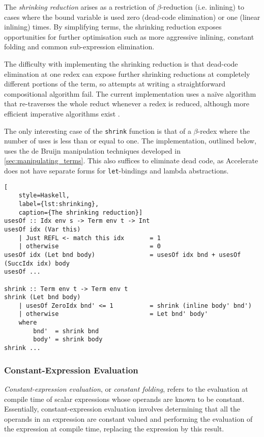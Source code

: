The \emph{shrinking reduction} arises as a restriction of $\beta$-reduction
(i.e. inlining) to cases where the bound variable is used zero (dead-code
elimination) or one (linear inlining) times. By simplifying terms,
the shrinking reduction exposes opportunities for further optimisation such as
more aggressive inlining, constant folding and common sub-expression
elimination. %

The difficulty with implementing the shrinking reduction is that dead-code
elimination at one redex can expose further shrinking reductions at completely
different portions of the term, so attempts at writing a straightforward
compositional algorithm fail. The current implementation uses a na\"ive
algorithm that re-traverses the whole reduct whenever a redex is reduced,
although more efficient imperative algorithms exist
\cite{Appel:1997gs,Benton:2004ua,Kennedy:2007cb}.

The only interesting case of the \texttt{shrink} function is that of a
$\beta$-redex where the number of uses is less than or equal to one. The
implementation, outlined below, uses the de Bruijn manipulation techniques
developed in \autoref{sec:manipulating_terms}. This also suffices to eliminate
dead code, as Accelerate does not have separate forms for \texttt{let}-bindings
and lambda abstractions.
%
\begin{lstlisting}[
    style=Haskell,
    label={lst:shrinking},
    caption={The shrinking reduction}]
usesOf :: Idx env s -> Term env t -> Int
usesOf idx (Var this)
    | Just REFL <- match this idx       = 1
    | otherwise                         = 0
usesOf idx (Let bnd body)               = usesOf idx bnd + usesOf (SuccIdx idx) body
usesOf ...

shrink :: Term env t -> Term env t
shrink (Let bnd body)
    | usesOf ZeroIdx bnd' <= 1          = shrink (inline body' bnd')
    | otherwise                         = Let bnd' body'
    where
        bnd'  = shrink bnd
        body' = shrink body
shrink ...
\end{lstlisting}


\subsubsection{Constant-Expression Evaluation}

\emph{Constant-expression evaluation}, or \emph{constant folding}, refers to the
evaluation at compile time of scalar expressions whose operands are known to be
constant. Essentially, constant-expression evaluation involves determining that
all the operands in an expression are constant valued and performing the
evaluation of the expression at compile time, replacing the expression by this
result.

